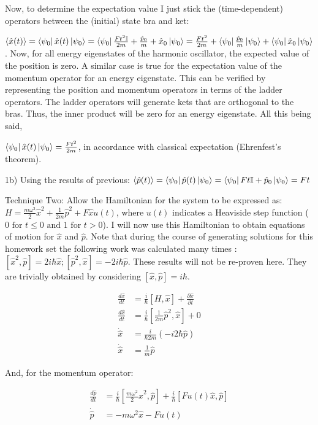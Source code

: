 \documentclass[aps,prl,preprint,groupedaddress]{revtex4-1}
\begin{document}
Now, to determine the expectation value I just stick the (time-dependent) operators between the (initial) state bra and ket:

$\left< \hat{x}(t) \right> =\bra{\psi_0}\hat{x}(t)\ket{\psi_0} = \bra{\psi_0}\frac{Ft^2\mathbb{I}}{2m}+\frac{\hat{p}_0}{m}+\hat{x}_0\ket{\psi_0}=\frac{Ft^2}{2m}+\bra{\psi_0}\frac{\hat{p}_0}{m}\ket{\psi_0}+\bra{\psi_0}\hat{x}_0\ket{\psi_0}$. Now, for all energy eigenstates of the harmonic oscillator, the expected value of the position is zero. A similar case is true for the expectation value of the momentum operator for an energy eigenstate. This can be verified by representing the position and momentum operators in terms of the ladder operators. The ladder operators will generate kets that are orthogonal to the bras. Thus, the inner product will be zero for an energy eigenstate. All this being said,

$\bra{\psi_0}\hat{x}(t)\ket{\psi_0} = \frac{Ft^2}{2m}$, in accordance with classical expectation (Ehrenfest's theorem).

1b) Using the results of previous: $\left< \hat{p}(t) \right>=\bra{\psi_0}\hat{p}(t)\ket{\psi_0} = \bra{\psi_0}Ft\mathbb{I}+\hat{p}_0\ket{\psi_0}=Ft$

Technique Two: Allow the Hamiltonian for the system to be expressed as: $H = \frac{m\omega^2}{2}\hat{x}^2+\frac{1}{2m}\hat{p}^2+F\hat{x}u(t)$, where $u(t)$ indicates a Heaviside step function ($0 \text{ for } t \le 0 \text{ and } 1 \text{ for } t > 0$). I will now use this Hamiltonian to obtain equations of motion for $\hat{x}$ and $\hat{p}$. Note that during the course of generating solutions for this homework set the following work was calculated many times : $[\hat{x}^2,\hat{p}]=2i\hbar\hat{x};[\hat{p}^2,\hat{x}]=-2i\hbar\hat{p}$. These results will not be re-proven here. They are trivially obtained by considering $[\hat{x},\hat{p}]=i\hbar$.

\begin{align*}
\frac{d\hat{x}}{dt} &= \frac{i}{\hbar}[H,\hat{x}] + \frac{\partial \hat{x}}{\partial t}\\
\frac{d\hat{x}}{dt} &= \frac{i}{\hbar}[\frac{1}{2m}\hat{p}^2,\hat{x}]+0\\
\dot{\hat{x}} &= \frac{i}{\hbar 2m}(-i2\hbar \hat{p})\\
\dot{\hat{x}} &= \frac{1}{m}\hat{p}
\end{align*}

And, for the momentum operator:

\begin{align*}
\frac{d\hat{p}}{dt} &= \frac{i}{\hbar}[\frac{m\omega^2}{2}\hat{x}^2,\hat{p}]+\frac{i}{\hbar}[Fu(t)\hat{x},\hat{p}]\\
\dot{\hat{p}} &= -m\omega^2\hat{x} - F u(t)
\end{align*}
\end{document}
